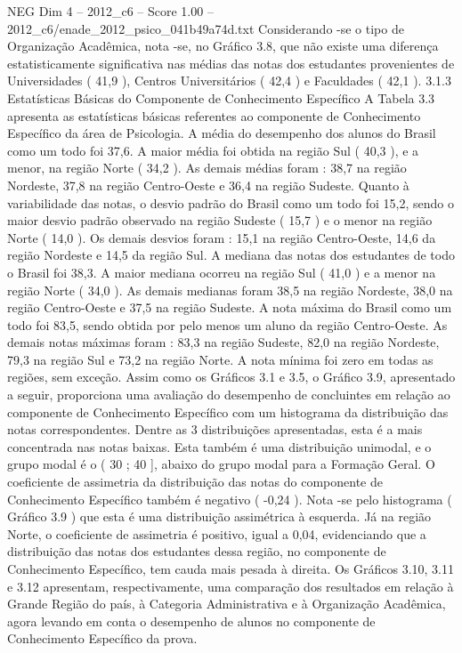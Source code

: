 \begin{textsample}{NEG Dim 4 – 2012\_c6 – Score 1.00 – 2012\_c6/enade\_2012\_psico\_041b49a74d.txt}
Considerando -se o tipo de Organização Acadêmica, nota -se, no Gráfico 3.8, que não existe uma diferença estatisticamente significativa nas médias das notas dos estudantes provenientes de Universidades ( 41,9 ), Centros Universitários ( 42,4 ) e Faculdades ( 42,1 ). 3.1.3 Estatísticas Básicas do Componente de Conhecimento Específico A Tabela 3.3 apresenta as estatísticas básicas referentes ao componente de Conhecimento Específico da área de Psicologia.
A média do desempenho dos alunos do Brasil como um todo foi 37,6.
A maior média foi obtida na região Sul ( 40,3 ), e a menor, na região Norte ( 34,2 ).
As demais médias foram : 38,7 na região Nordeste, 37,8 na região Centro-Oeste e 36,4 na região Sudeste.
Quanto à variabilidade das notas, o desvio padrão do Brasil como um todo foi 15,2, sendo o maior desvio padrão observado na região Sudeste ( 15,7 ) e o menor na região Norte ( 14,0 ).
Os demais desvios foram : 15,1 na região Centro-Oeste, 14,6 da região Nordeste e 14,5 da região Sul.
A mediana das notas dos estudantes de todo o Brasil foi 38,3.
A maior mediana ocorreu na região Sul ( 41,0 ) e a menor na região Norte ( 34,0 ).
As demais medianas foram 38,5 na região Nordeste, 38,0 na região Centro-Oeste e 37,5 na região Sudeste.
A nota máxima do Brasil como um todo foi 83,5, sendo obtida por pelo menos um aluno da região Centro-Oeste.
As demais notas máximas foram : 83,3 na região Sudeste, 82,0 na região Nordeste, 79,3 na região Sul e 73,2 na região Norte.
A nota mínima foi zero em todas as regiões, sem exceção.
Assim como os Gráficos 3.1 e 3.5, o Gráfico 3.9, apresentado a seguir, proporciona uma avaliação do desempenho de concluintes em relação ao componente de Conhecimento Específico com um histograma da distribuição das notas correspondentes.
Dentre as 3 distribuições apresentadas, esta é a mais concentrada nas notas baixas.
Esta também é uma distribuição unimodal, e o grupo modal é o ( 30 ; 40 ], abaixo do grupo modal para a Formação Geral.
O coeficiente de assimetria da distribuição das notas do componente de Conhecimento Específico também é negativo ( -0,24 ).
Nota -se pelo histograma ( Gráfico 3.9 ) que esta é uma distribuição assimétrica à esquerda.
Já na região Norte, o coeficiente de assimetria é positivo, igual a 0,04, evidenciando que a distribuição das notas dos estudantes dessa região, no componente de Conhecimento Específico, tem cauda mais pesada à direita.
Os Gráficos 3.10, 3.11 e 3.12 apresentam, respectivamente, uma comparação dos resultados em relação à Grande Região do país, à Categoria Administrativa e à Organização Acadêmica, agora levando em conta o desempenho de alunos no componente de Conhecimento Específico da prova.

\end{textsample}
